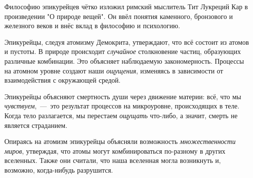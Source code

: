 Философию эпикурейцев чётко изложил римский мыслитель Тит Лукреций Кар в произведении "О природе вещей". Он ввёл понятия каменного, бронзового и железного веков и внёс вклад в философию и психологию. 

Эпикурейцы, следуя атомизму Демокрита, утверждают, что всё состоит из атомов и пустоты. В природе происходит \textit{случайное} столкновение частиц, образующих различные комбинации. Это объясняет наблюдаемую закономерность. Процессы на атомном уровне создают наши \textit{ощущения}, изменяясь в зависимости от взаимодействия с окружающей средой.


Эпикурейцы объясняют смертность души через движение материи: всё, что мы \textit{чувствуем},~---~это результат процессов на микроуровне, происходящих в теле. Когда тело разлагается, мы перестаем \textit{ощущать} что-либо, а значит, смерть не является страданием.  


Опираясь на атомизм эпикурейцы объясняли возможность \textit{множественности миров}, утверждая, что атомы могут комбинироваться по-разному в других вселенных. Также они считали, что наша вселенная могла возникнуть и, возможно, когда-нибудь разрушится.

